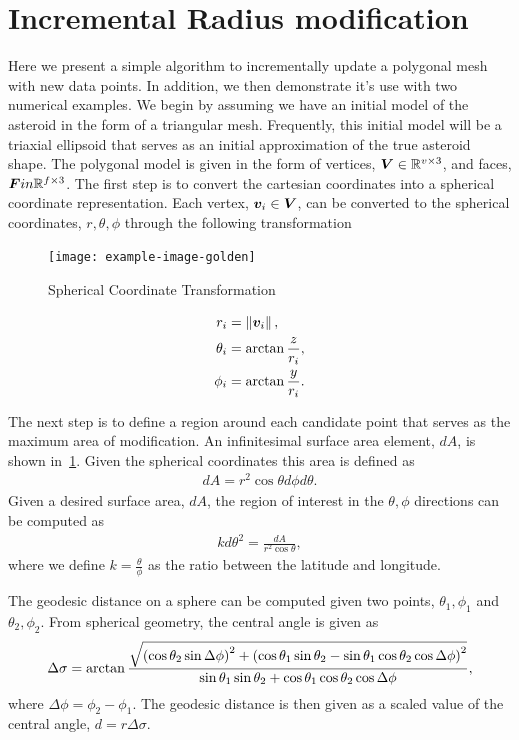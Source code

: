 \section{Incremental Radius modification}
 
Here we present a simple algorithm to incrementally update a polygonal mesh with new data points.
In addition, we then demonstrate it's use with two numerical examples.
We begin by assuming we have an initial model of the asteroid in the form of a triangular mesh.
Frequently, this initial model will be a triaxial ellipsoid that serves as an initial approximation of the true asteroid shape.
The polygonal model is given in the form of vertices, \( \bm{V} \in \mathbb{R}^{v \times 3}\), and faces, \( \bm{F} in \mathbb{R}^{f \times 3} \).
The first step is to convert the cartesian coordinates into a spherical coordinate representation. 
Each vertex, \( \bm{v}_i \in \bm{V} \), can be converted to the spherical coordinates, \( r, \theta, \phi \) through the following transformation
\begin{figure}[htbp]
    \centering
    \texttt{[image: example-image-golden]}
    \caption{Spherical Coordinate Transformation~\label{fig:spherical_coordinate_transformation}}
\end{figure}
\begin{align}
    r_i &= \left\| \bm{v}_i \right\|, \\ 
    \theta_i &= \arctan{\frac{z}{r_i}}, \\
    \phi_i &= \arctan{\frac{y}{r_i}}.
\end{align}

The next step is to define a region around each candidate point that serves as the maximum area of modification. 
An infinitesimal surface area element, \( d A \), is shown in~\cref{fig:spherical_coordinate_transformation}.
Given the spherical coordinates this area is defined as
\begin{align}
    d A = r^2 \cos \theta d \phi d \theta .
\end{align}
Given a desired surface area, \( d A \), the region of interest in the \( \theta, \phi \) directions can be computed as
\begin{align}
    k d \theta ^2 = \frac{d A}{r^2 \cos \theta}, 
\end{align}
where we define \( k = \frac{ \theta}{\phi} \) as the ratio between the latitude and longitude.

The geodesic distance on a sphere can be computed given two points, \( \theta_1, \phi_1\) and \( \theta_2, \phi_2\).
From spherical geometry, the central angle is given as
\begin{align}
    \Delta \sigma = \arctan \frac{\sqrt{\left( \cos \theta_2 \sin \Delta \phi \right)^2 + \left( \cos \theta_1 \sin \theta_2 - \sin \theta_1 \cos \theta_2 \cos \Delta \phi \right)^2 }}
    {\sin \theta_1 \sin \theta_2 + \cos \theta_1 \cos \theta_2 \cos \Delta \phi} , 
\end{align}
where \( \Delta \phi = \phi_2 - \phi_1 \).
The geodesic distance is then given as a scaled value of the central angle, \( d = r \Delta \sigma\).

